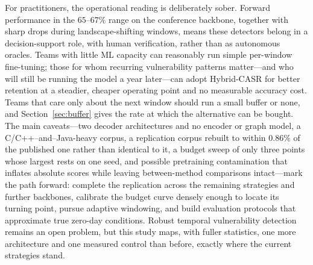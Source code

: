 \documentclass[a4paper,twoside]{article}
\begin{document}
For practitioners, the operational reading is deliberately sober. Forward performance in the $65$--$67\%$ range on the conference backbone, together with sharp drops during landscape-shifting windows, means these detectors belong in a decision-support role, with human verification, rather than as autonomous oracles. Teams with little ML capacity can reasonably run simple per-window fine-tuning; those for whom recurring vulnerability patterns matter---and who will still be running the model a year later---can adopt Hybrid-CASR for better retention at a steadier, cheaper operating point and no measurable accuracy cost. Teams that care only about the next window should run a small buffer or none, and Section~\ref{sec:buffer} gives the rate at which the alternative can be bought. The main caveats---two decoder architectures and no encoder or graph model, a C/C++--and--Java-heavy corpus, a replication corpus rebuilt to within $0.86\%$ of the published one rather than identical to it, a budget sweep of only three points whose largest rests on one seed, and possible pretraining contamination that inflates absolute scores while leaving between-method comparisons intact---mark the path forward: complete the replication across the remaining strategies and further backbones, calibrate the budget curve densely enough to locate its turning point, pursue adaptive windowing, and build evaluation protocols that approximate true zero-day conditions. Robust temporal vulnerability detection remains an open problem, but this study maps, with fuller statistics, one more architecture and one measured control than before, exactly where the current strategies stand.



{\small
}

\end{document}
